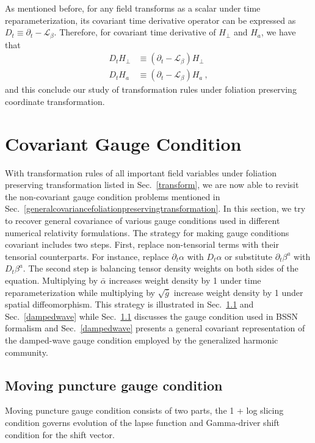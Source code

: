 As mentioned before, for any field transforms as a scalar under time reparameterization, its covariant time derivative operator can be expressed as $D_{t} \equiv \partial_{t} - \mathcal{L}_{\beta}$. Therefore, for covariant time derivative of $H_{\perp}$ and $H_{a}$, we have that
\begin{subequations}
	\begin{align}
		D_{t}H_{\perp} &\equiv \left(\partial_{t} - \mathcal{L}_{\beta}\right)H_{\perp}\\
		D_{t}H_{a} &\equiv \left(\partial_{t} - \mathcal{L}_{\beta}\right)H_{a} \ ,
	\end{align}
\end{subequations}
and this conclude our study of transformation rules under foliation preserving coordinate transformation. 

\section{Covariant Gauge Condition}\label{gauge}
With transformation rules of all important field variables under foliation preserving transformation listed in Sec.~\ref{transform}, we are now able to revisit the non-covariant gauge condition problems mentioned in Sec.~\ref{generalcovariancefoliationpreservingtransformation}. In this section, we try to recover general covariance of various gauge conditions used in different numerical relativity formulations. The strategy for making gauge conditions covariant includes two steps. First, replace non-tensorial terms with their tensorial counterparts. For instance, replace $\partial_{t}\alpha$ with $D_{t}\alpha$ or substitute $\partial_{t}\beta^{a}$ with $D_{t}\beta^{a}$. The second step is balancing tensor density weights on both sides of the equation. Multiplying by ${\bar \alpha}$ increases weight density by 1 under time reparameterization while multiplying by $\sqrt{{\bar g}}$ increase weight density by 1 under spatial diffeomorphism. This strategy is illustrated in Sec.~\ref{movingpuncture} and Sec.~\ref{dampedwave} while Sec.~\ref{movingpuncture} discusses the gauge condition used in BSSN formalism and Sec.~\ref{dampedwave} presents a general covariant representation of the damped-wave gauge condition\cite{Pretorius:2006tp, Szilagyi:2009qz, Lindblom:2009tu} employed by the generalized harmonic community. 
\subsection{Moving puncture gauge condition}\label{movingpuncture}
Moving puncture gauge condition consists of two parts, the 1 + log slicing condition governs evolution of the lapse function and Gamma-driver shift condition for the shift vector. 


